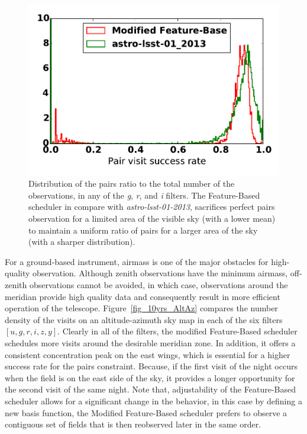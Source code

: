 \documentclass[12pt]{aastex62}
\theoremstyle{definition}
\begin{document}
\begin{figure}[h!]
\centering
\includegraphics[width=.4\linewidth]{Figures/PairHist.pdf}
\caption{Distribution of the pairs ratio to the total number of the observations, in any of the \textit{g}, \textit{r}, and \textit{i} filters. The Feature-Based scheduler in compare with \textit{astro-lsst-01-2013}, sacrifices perfect pairs observation for a limited area of the visible sky (with a lower mean) to maintain a uniform ratio of pairs for a larger area of the sky (with a sharper distribution).}
\label{fig_10yrs_pair_hist}
\end{figure}

For a ground-based instrument, airmass is one of the major obstacles for high-quality observation. Although zenith observations have the minimum airmass, off-zenith observations cannot be avoided, in which case, observations around the meridian provide high quality data and consequently result in more efficient operation of the telescope. Figure~\ref{fig_10yrs_AltAz} compares the number density of the visits on an altitude-azimuth sky map in each of the six filters $[u,g,r,i,z,y]$. Clearly in all of the filters, the modified Feature-Based scheduler schedules more visits around the desirable meridian zone. In addition, it offers a consistent concentration peak on the east wings, which is essential for a higher success rate for the pairs constraint. Because, if the first visit of the night occurs when the field is on the east side of the sky, it provides a longer opportunity for the second visit of the same night. Note that, adjustability of the Feature-Based scheduler allows for a significant change in the behavior, in this case by defining a new basis function, the Modified Feature-Based scheduler prefers to observe a contiguous set of fields that is then reobserved later in the same order.
\end{document}
